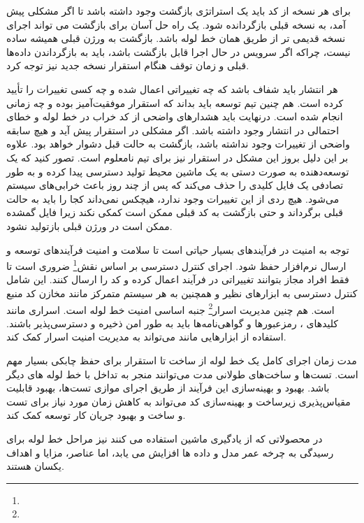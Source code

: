 برای هر نسخه از کد باید یک استراتژی بازگشت وجود داشته باشد تا اگر مشکلی پیش آمد، به نسخه قبلی بازگردانده شود. یک راه حل آسان برای بازگشت می تواند اجرای نسخه قدیمی تر از طریق همان خط لوله  باشد. بازگشت به ورژن قبلی همیشه ساده نیست، چراکه اگر سرویس در حال اجرا قابل بازگشت باشد، باید به بازگرداندن داده‌ها قبلی و زمان توقف هنگام استقرار نسخه جدید نیز توجه کرد.

هر انتشار باید شفاف باشد که چه تغییراتی اعمال شده و چه کسی تغییرات را تأیید کرده است. هم چنین تیم توسعه باید بداند که استقرار موفقیت‌آمیز بوده و چه زمانی انجام شده است. درنهایت باید هشدارهای واضحی از کد خراب در خط لوله و خطای احتمالی در انتشار وجود داشته باشد. اگر مشکلی در استقرار پیش آید و هیچ سابقه واضحی از تغییرات وجود نداشته باشد، بازگشت به حالت قبل دشوار خواهد بود. علاوه بر این دلیل بروز این مشکل در استقرار نیز برای تیم نامعلوم است. تصور کنید که یک توسعه‌دهنده به صورت دستی به یک ماشین محیط تولید دسترسی پیدا کرده و به طور تصادفی یک فایل کلیدی را حذف می‌کند که پس از چند روز باعث خرابی‌های سیستم می‌شود. هیچ ردی از این تغییرات وجود ندارد، هیچکس نمی‌داند کجا را باید به حالت قبلی برگرداند و حتی بازگشت به کد قبلی ممکن است کمکی نکند زیرا فایل گمشده ممکن است در ورژن قبلی بازتولید نشود.

توجه به امنیت در فرآیندهای  بسیار حیاتی است تا سلامت و امنیت فرآیندهای توسعه و ارسال نرم‌افزار حفظ شود. اجرای کنترل دسترسی بر اساس نقش\footnote{} ضروری است تا فقط افراد مجاز بتوانند تغییراتی در فرآیند  اعمال کرده و کد را ارسال کنند. این شامل کنترل دسترسی به ابزارهای  نظیر  و همچنین به هر سیستم متمرکز مانند مخازن کد منبع است. هم چنین مدیریت اسرار\footnote{} جنبه اساسی امنیت خط لوله است. اسراری مانند کلیدهای ، رمزعبورها و گواهی‌نامه‌ها باید به طور امن ذخیره و دسترسی‌پذیر باشند. استفاده از ابزارهایی مانند 
می‌تواند به مدیریت امنیت اسرار کمک کند.

مدت زمان اجرای کامل یک خط لوله از ساخت تا استقرار برای حفظ چابکی بسیار مهم است. تست‌ها و ساخت‌های طولانی مدت می‌توانند منجر به تداخل‌ با خط لوله های دیگر باشد. بهبود و بهینه‌سازی این فرآیند از طریق اجرای موازی تست‌ها، بهبود قابلیت مقیاس‌پذیری زیرساخت و بهینه‌سازی کد می‌تواند به کاهش زمان مورد نیاز برای تست و ساخت و بهبود جریان کار توسعه کمک کند.

در محصولاتی که از یادگیری ماشین استفاده می کنند نیز مراحل خط لوله برای رسیدگی به چرخه عمر مدل و داده ها افزایش می یابد، اما عناصر، مزایا و اهداف یکسان هستند.

